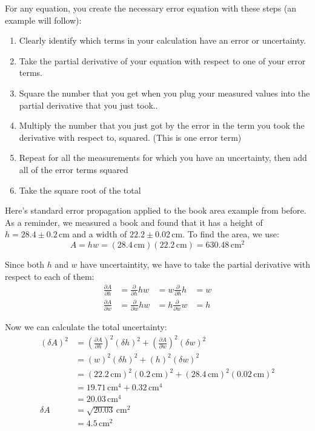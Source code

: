 \documentclass[twoside,11pt,ShortChapTitles]{BYUTextbook}
\begin{document}
 For any equation, you create the necessary error equation with these steps (an example will follow):
 \begin{enumerate}
 \item Clearly identify which terms in your calculation have an error or uncertainty.
 \item Take the partial derivative of your equation with respect to one of your error terms.
 \item Square the number that you get when you plug your measured values into the partial derivative that you just took..
 \item Multiply the number that you just got by the error in the term you took the derivative with respect to, squared.  (This is one error term)
 \item Repeat for all the measurements for which you have an uncertainty, then add all of the error terms squared
 \item Take the square root of the total
 \end{enumerate}
 
 Here's standard error propagation applied to the book area example from before. As a reminder, we measured a  book and found that it has a height of $h=28.4\pm0.2\,\text{cm} $ and a width of $22.2 \pm0.02\,\text{cm}$.  To find the area, we use:
\[A = hw= (28.4\,\text{cm})(22.2\,\text{cm}) = 630.48\,\text{cm}^2\]

Since both $h$ and $w$ have uncertaintity, we have to take the partial derivative with respect to each of them:
\[\begin{aligned}
\frac{\partial A}{\partial h} &= \frac{\partial}{\partial h} hw&= w\frac{\partial}{\partial h} h &= w\\
\frac{\partial A}{\partial w} &= \frac{\partial}{\partial w} hw&= h\frac{\partial}{\partial w} w &= h
\end{aligned}\]

Now we can calculate the total uncertainty:
\begin{align*}
\left(\delta A\right)^2&=\left(\frac{\partial A}{\partial h}\right)^2\left(\delta h\right)^2+\left(\frac{\partial A}{\partial w}\right)^2\left(\delta w\right)^2\\
&=\left(w\right)^2\left(\delta h\right)^2+\left(h\right)^2\left(\delta w\right)^2\\
&=\left(22.2\,\text{cm}\right)^2\left(0.2\,\text{cm}\right)^2+\left(28.4\,\text{cm}\right)^2\left(0.02\,\text{cm}\right)^2\\
&=19.71\,\text{cm}^4+0.32\,\text{cm}^4\\
&=20.03\,\text{cm}^4\\
\delta A &=\sqrt{20.03}\,\text{cm}^2\\
&=4.5 \,\text{cm}^2
\end{align*}
\end{document}
